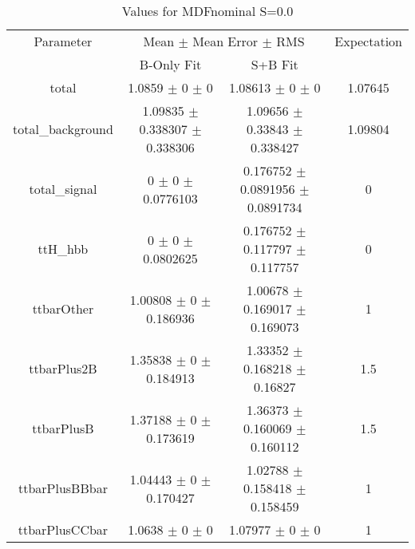 \begin{table}
\centering
\caption{Values for MDFnominal S=0.0}
\begin{tabular}{cccc}
\toprule
Parameter & \multicolumn{2}{c}{Mean $\pm$ Mean Error $\pm$ RMS} & Expectation\\
 & B-Only Fit & S+B Fit & \\
\midrule
total & \num{1.0859} $\pm$ \num{0} $\pm$ \num{0} & \num{1.08613} $\pm$ \num{0} $\pm$ \num{0} & \num{1.07645}\\
total\_background & \num{1.09835} $\pm$ \num{0.338307} $\pm$ \num{0.338306} & \num{1.09656} $\pm$ \num{0.33843} $\pm$ \num{0.338427} & \num{1.09804}\\
total\_signal & \num{0} $\pm$ \num{0} $\pm$ \num{0.0776103} & \num{0.176752} $\pm$ \num{0.0891956} $\pm$ \num{0.0891734} & \num{0}\\
ttH\_hbb & \num{0} $\pm$ \num{0} $\pm$ \num{0.0802625} & \num{0.176752} $\pm$ \num{0.117797} $\pm$ \num{0.117757} & \num{0}\\
ttbarOther & \num{1.00808} $\pm$ \num{0} $\pm$ \num{0.186936} & \num{1.00678} $\pm$ \num{0.169017} $\pm$ \num{0.169073} & \num{1}\\
ttbarPlus2B & \num{1.35838} $\pm$ \num{0} $\pm$ \num{0.184913} & \num{1.33352} $\pm$ \num{0.168218} $\pm$ \num{0.16827} & \num{1.5}\\
ttbarPlusB & \num{1.37188} $\pm$ \num{0} $\pm$ \num{0.173619} & \num{1.36373} $\pm$ \num{0.160069} $\pm$ \num{0.160112} & \num{1.5}\\
ttbarPlusBBbar & \num{1.04443} $\pm$ \num{0} $\pm$ \num{0.170427} & \num{1.02788} $\pm$ \num{0.158418} $\pm$ \num{0.158459} & \num{1}\\
ttbarPlusCCbar & \num{1.0638} $\pm$ \num{0} $\pm$ \num{0} & \num{1.07977} $\pm$ \num{0} $\pm$ \num{0} & \num{1}\\
\bottomrule
\end{tabular}
\end{table}